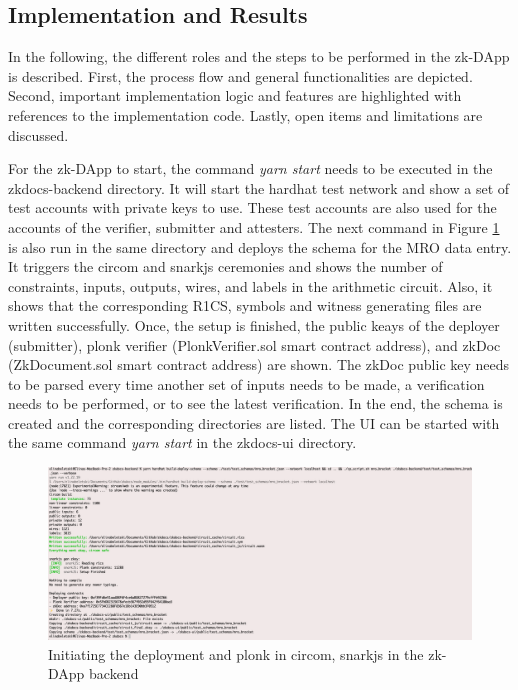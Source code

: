 \subsection{Implementation and Results}
In the following, the different roles and the steps to be performed in the zk-DApp is described. First, the process flow and general functionalities are depicted. Second, important implementation logic and features are highlighted with references to the implementation code. Lastly, open items and limitations are discussed.

For the zk-DApp to start, the command \textit{yarn start} needs to be executed in the zkdocs-backend directory. It will start the hardhat test network and show a set of test accounts with private keys to use. These test accounts are also used for the accounts of the verifier, submitter and attesters. The next command in Figure \ref{fig:second-cmd} is also run in the same directory and deploys the schema for the MRO data entry. It triggers the circom and snarkjs ceremonies and shows the number of constraints, inputs, outputs, wires, and labels in the arithmetic circuit. Also, it shows that the corresponding R1CS, symbols and witness generating files are written successfully. Once, the setup is finished, the public keays of the deployer (submitter), plonk verifier (PlonkVerifier.sol smart contract address), and zkDoc (ZkDocument.sol smart contract address) are shown. The zkDoc public key needs to be parsed every time another set of inputs needs to be made, a verification needs to be performed, or to see the latest verification. In the end, the schema is created and the corresponding directories are listed. The UI can be started with the same command \textit{yarn start} in the zkdocs-ui directory.

\begin{figure}[hbt]
	\centering
		\includegraphics[width=1.0\textwidth]{Pictures/second-cmd.png}
	\caption{Initiating the deployment and plonk in circom, snarkjs in the zk-DApp backend}
	\label{fig:second-cmd}
\end{figure}

